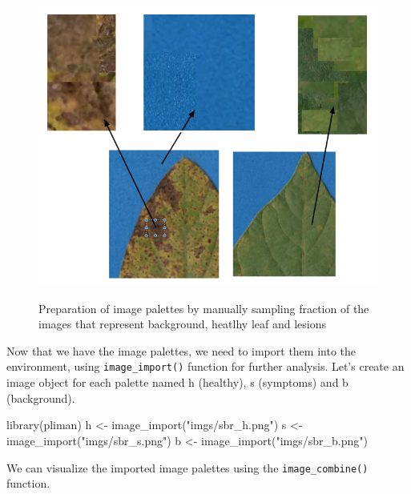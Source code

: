 \documentclass[
  letterpaper,
]{book}
\newenvironment{Shaded}{\begin{snugshade}}{\end{snugshade}}
\newcommand{\FunctionTok}[1]{\textcolor[rgb]{0.28,0.35,0.67}{#1}}
\newcommand{\NormalTok}[1]{\textcolor[rgb]{0.00,0.23,0.31}{#1}}
\newcommand{\OtherTok}[1]{\textcolor[rgb]{0.00,0.23,0.31}{#1}}
\newcommand{\StringTok}[1]{\textcolor[rgb]{0.13,0.47,0.30}{#1}}
\begin{document}
\begin{figure}

{\centering 

\href{Fig_palettes}{\includegraphics{imgs/pliman1.png}}

}

\caption{\label{fig-pliman1}Preparation of image palettes by manually
sampling fraction of the images that represent background, heatlhy leaf
and lesions}

\end{figure}

Now that we have the image palettes, we need to import them into the
environment, using \texttt{image\_import()} function for further
analysis. Let's create an image object for each palette named h
(healthy), s (symptoms) and b (background).

\begin{Shaded}
\begin{Highlighting}[]
\FunctionTok{library}\NormalTok{(pliman)}
\NormalTok{h }\OtherTok{\textless{}{-}} \FunctionTok{image\_import}\NormalTok{(}\StringTok{"imgs/sbr\_h.png"}\NormalTok{)}
\NormalTok{s }\OtherTok{\textless{}{-}} \FunctionTok{image\_import}\NormalTok{(}\StringTok{"imgs/sbr\_s.png"}\NormalTok{)}
\NormalTok{b }\OtherTok{\textless{}{-}} \FunctionTok{image\_import}\NormalTok{(}\StringTok{"imgs/sbr\_b.png"}\NormalTok{)}
\end{Highlighting}
\end{Shaded}

We can visualize the imported image palettes using the
\texttt{image\_combine()} function.
\end{document}
